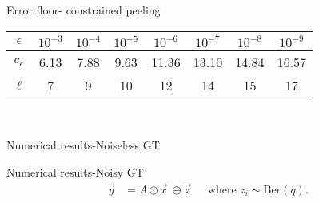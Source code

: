 \begin{frame}{Error floor- constrained peeling}
\centering
\begin{tabular}{| c | c | c | c | c | c | c | c | }
\hline
$\epsilon$ & $10^{-3}$ & $10^{-4}$ & $10^{-5}$ & $10^{-6}$ &$ 10^{-7}$ & $10^{-8}$ & $10^{-9}$ \\ \hline
$c_\epsilon$ & 6.13 & 7.88 & 9.63 & 11.36 & 13.10 & 14.84 & 16.57 \\ \hline
 $\ell$ & 7 & 9 & 10 & 12 & 14 & 15 & 17 \\ \hline
\end{tabular}
\\

\end{frame}

\begin{frame}{Numerical results-Noiseless GT}
\centering
\resizebox{0.6\textwidth}{!}{}
\end{frame}

\begin{frame}{Numerical results-Noisy GT}
\vspace{-1ex}
\begin{align*}
\vec{y}&=A\odot \vec{x} ~\oplus \vec{z}~~\quad	\text{where } z_i\sim \text{Ber}(q).
\end{align*}

\centering
\resizebox{0.6\textwidth}{!}{}
\end{frame}
